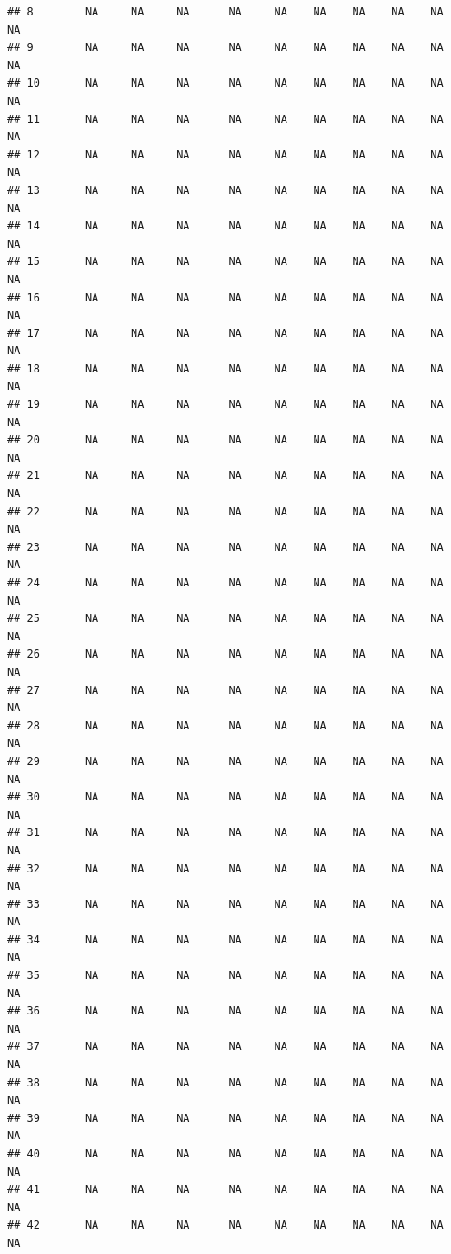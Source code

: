 \documentclass{article}\usepackage{graphicx, color}
\makeatletter
\newenvironment{kframe}{%
 \def\at@end@of@kframe{}%
 \ifinner\ifhmode%
  \def\at@end@of@kframe{\end{minipage}}%
  \begin{minipage}{\columnwidth}%
 \fi\fi%
 \def\FrameCommand##1{\hskip\@totalleftmargin \hskip-\fboxsep
 \colorbox{shadecolor}{##1}\hskip-\fboxsep
     \hskip-\linewidth \hskip-\@totalleftmargin \hskip\columnwidth}%
 \MakeFramed {\advance\hsize-\width
   \@totalleftmargin\z@ \linewidth\hsize
   \@setminipage}}%
 {\par\unskip\endMakeFramed%
 \at@end@of@kframe}
\newenvironment{knitrout}{}{} %
\makeatother
\begin{document}
\begin{knitrout}
\begin{kframe}
\begin{verbatim}
## 8        NA     NA     NA      NA     NA    NA    NA    NA    NA     NA
## 9        NA     NA     NA      NA     NA    NA    NA    NA    NA     NA
## 10       NA     NA     NA      NA     NA    NA    NA    NA    NA     NA
## 11       NA     NA     NA      NA     NA    NA    NA    NA    NA     NA
## 12       NA     NA     NA      NA     NA    NA    NA    NA    NA     NA
## 13       NA     NA     NA      NA     NA    NA    NA    NA    NA     NA
## 14       NA     NA     NA      NA     NA    NA    NA    NA    NA     NA
## 15       NA     NA     NA      NA     NA    NA    NA    NA    NA     NA
## 16       NA     NA     NA      NA     NA    NA    NA    NA    NA     NA
## 17       NA     NA     NA      NA     NA    NA    NA    NA    NA     NA
## 18       NA     NA     NA      NA     NA    NA    NA    NA    NA     NA
## 19       NA     NA     NA      NA     NA    NA    NA    NA    NA     NA
## 20       NA     NA     NA      NA     NA    NA    NA    NA    NA     NA
## 21       NA     NA     NA      NA     NA    NA    NA    NA    NA     NA
## 22       NA     NA     NA      NA     NA    NA    NA    NA    NA     NA
## 23       NA     NA     NA      NA     NA    NA    NA    NA    NA     NA
## 24       NA     NA     NA      NA     NA    NA    NA    NA    NA     NA
## 25       NA     NA     NA      NA     NA    NA    NA    NA    NA     NA
## 26       NA     NA     NA      NA     NA    NA    NA    NA    NA     NA
## 27       NA     NA     NA      NA     NA    NA    NA    NA    NA     NA
## 28       NA     NA     NA      NA     NA    NA    NA    NA    NA     NA
## 29       NA     NA     NA      NA     NA    NA    NA    NA    NA     NA
## 30       NA     NA     NA      NA     NA    NA    NA    NA    NA     NA
## 31       NA     NA     NA      NA     NA    NA    NA    NA    NA     NA
## 32       NA     NA     NA      NA     NA    NA    NA    NA    NA     NA
## 33       NA     NA     NA      NA     NA    NA    NA    NA    NA     NA
## 34       NA     NA     NA      NA     NA    NA    NA    NA    NA     NA
## 35       NA     NA     NA      NA     NA    NA    NA    NA    NA     NA
## 36       NA     NA     NA      NA     NA    NA    NA    NA    NA     NA
## 37       NA     NA     NA      NA     NA    NA    NA    NA    NA     NA
## 38       NA     NA     NA      NA     NA    NA    NA    NA    NA     NA
## 39       NA     NA     NA      NA     NA    NA    NA    NA    NA     NA
## 40       NA     NA     NA      NA     NA    NA    NA    NA    NA     NA
## 41       NA     NA     NA      NA     NA    NA    NA    NA    NA     NA
## 42       NA     NA     NA      NA     NA    NA    NA    NA    NA     NA

\end{verbatim}
\end{kframe}
\end{knitrout}
\end{document}
